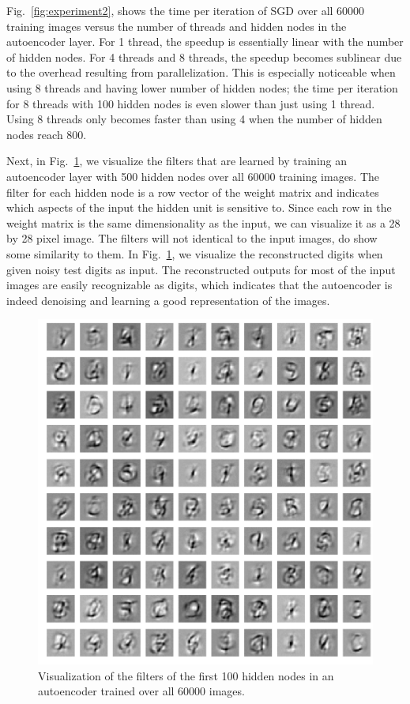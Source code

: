 \documentclass[conference]{IEEEtran}
\begin{document}
Fig.~\ref{fig:experiment2}, shows the time per iteration of SGD over all 60000 training images versus the number of threads and hidden nodes in the autoencoder layer. For 1 thread, the speedup is essentially linear with the number of hidden nodes. For 4 threads and 8 threads, the speedup becomes sublinear due to the overhead resulting from parallelization. This is especially noticeable when using 8 threads and having lower number of hidden nodes; the time per iteration for 8 threads with 100 hidden nodes is even slower than just using 1 thread. Using 8 threads only becomes faster than using 4 when the number of hidden nodes reach 800. 

Next, in Fig.~\ref{fig:experiment3_1}, we visualize the filters that are learned by training an autoencoder layer with 500 hidden nodes over all 60000 training images. The  filter for each hidden node is a row vector of the weight matrix and indicates which aspects of the input the hidden unit is sensitive to. Since each row in the weight matrix is the same dimensionality as the input, we can visualize it as a 28 by 28 pixel image. The filters will not identical to the input images, do show some similarity to them. In Fig.~\ref{fig:experiment3_1}, we visualize the reconstructed digits when given noisy test digits as input. The reconstructed outputs for most of the input images are easily recognizable as digits, which indicates that the autoencoder is indeed denoising and learning a good representation of the images.

\begin{figure}[h]
\centering
\includegraphics[width=0.8\linewidth]{experiment3_1.png}
\caption{Visualization of the filters of the first 100 hidden nodes in an autoencoder trained over all 60000 images.}
\label{fig:experiment3_1}
\end{figure}
\end{document}
